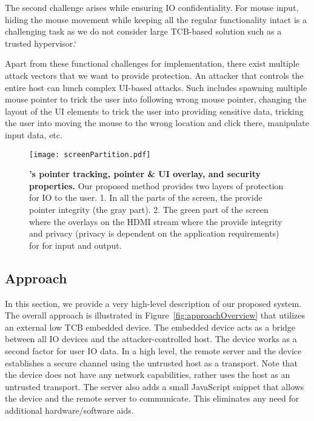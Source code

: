 The second challenge arises while ensuring IO confidentiality. For mouse input, hiding the mouse movement while keeping all the regular functionality intact is a challenging task as we do not consider large TCB-based solution such as a trusted hypervisor.`


Apart from these functional challenges for implementation, there exist multiple attack vectors that we want to provide protection. An attacker that controls the entire host can lunch complex UI-based attacks. Such includes spawning multiple mouse pointer to trick the user into following wrong mouse pointer, changing the layout of the UI elements to trick the user into providing sensitive data, tricking the user into moving the mouse to the wrong location and click there, manipulate input data, etc.


\begin{figure}[t]
\centering
\texttt{[image: screenPartition.pdf]}
\caption{\textbf{\device's pointer tracking, pointer \& UI overlay, and security properties.} Our proposed method provides two layers of protection for IO to the user. 1. In all the parts of the screen, the \device provide pointer integrity (the gray part). 2. The green part of the screen where the \device overlays on the HDMI stream where the \device provide integrity and privacy (privacy is dependent on the application requirements) for for input and output.}
\label{fig:screenPartition}
\centering
\end{figure}

\subsection{Approach}

In this section, we provide a very high-level description of our proposed system. 
The overall approach is illustrated in Figure~\ref{fig:approachOverview} that utilizes an external low TCB embedded device. The embedded device acts as a bridge between all IO devices and the attacker-controlled host. The device works as a second factor for user IO data. In a high level, the remote server and the device establishes a secure channel using the untrusted host as a transport. Note that the  device does not have any network capabilities, rather uses the host as an untrusted transport. The server also adds a small JavaScript snippet that allows the device and the remote server to communicate. This eliminates any need for additional hardware/software aids.

